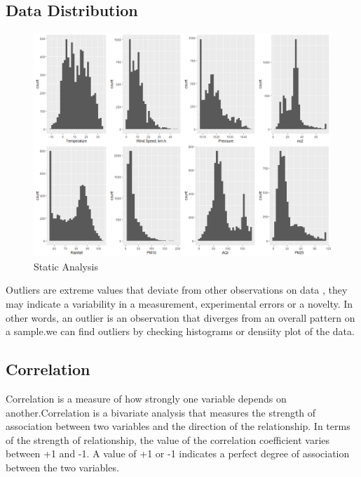 \subsection{Data Distribution}
\begin{figure}[h!]
\label{bc}
\centering
\includegraphics[width= 16 cm]{Histogram.png}
\caption{Static Analysis}
\end{figure}
Outliers are extreme values that deviate from other observations on data , they may indicate a variability in a measurement, experimental errors or a novelty. In other words, an outlier is an observation that diverges from an overall pattern on a sample.we can find outliers by checking histograms or densiity plot of the data.

\subsection{Correlation}
Correlation is a measure of how strongly one variable depends on another.Correlation is
a bivariate analysis that measures the strength of association between two variables and
the direction of the relationship. In terms of the strength of relationship, the value of the
correlation coefficient varies between +1 and -1. A value of +1 or -1 indicates a perfect
degree of association between the two variables.
